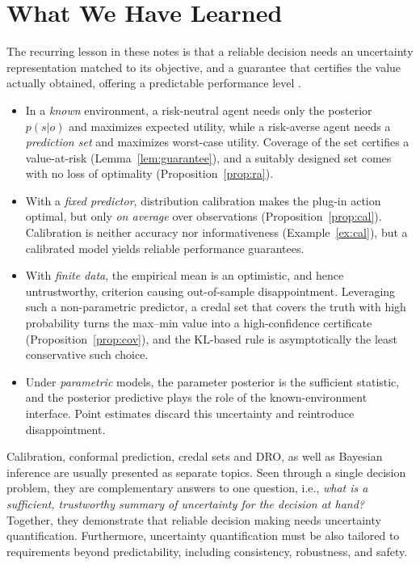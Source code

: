 \documentclass[journal]{IEEEtran}
\theoremstyle{definition}
\theoremstyle{remark}
\begin{document}
\section{What We Have Learned}
{ The recurring lesson in these notes is that a reliable decision needs an uncertainty
representation {matched to its objective}, and a {guarantee} that
certifies the value actually obtained, offering a predictable performance level \cite{rabanser2026towards}.}

\begin{itemize}
\item In a \emph{known} environment, a risk-neutral agent needs only the
posterior $p(s| o)$ and maximizes expected utility, while a risk-averse agent
needs a \emph{prediction set} and maximizes worst-case utility. Coverage of
the set certifies a value-at-risk (Lemma~\ref{lem:guarantee}), and a suitably designed set comes with no loss of optimality  (Proposition~\ref{prop:ra}).

\item With a \emph{fixed predictor}, distribution calibration makes the
plug-in action optimal, but only \emph{on average} over observations
(Proposition~\ref{prop:cal}). Calibration is neither accuracy nor
informativeness (Example~\ref{ex:cal}), but a calibrated model yields reliable performance guarantees. 

\item With \emph{finite data}, the empirical mean is an optimistic, and hence
untrustworthy, criterion causing out-of-sample disappointment. Leveraging such a non-parametric predictor, a credal set that
covers the truth with high probability turns the max--min value into a
high-confidence certificate (Proposition~\ref{prop:cov}), and the KL-based rule is
asymptotically the least conservative such choice.

\item Under \emph{parametric} models, the parameter posterior is the
sufficient statistic, and the posterior predictive plays the role of the
known-environment interface. Point
estimates discard this uncertainty and reintroduce disappointment.
\end{itemize}

Calibration, conformal prediction, credal sets and DRO, as well as Bayesian inference
are usually presented as separate topics. Seen through a single decision
problem, they are complementary answers to one question, i.e., \emph{what is a
sufficient, trustworthy summary of uncertainty for the decision at
hand?} Together, they demonstrate that reliable decision making \cite{rabanser2026towards} needs
uncertainty quantification. { Furthermore, uncertainty quantification must be also tailored to requirements beyond predictability, including consistency, robustness, and safety.}
\end{document}
